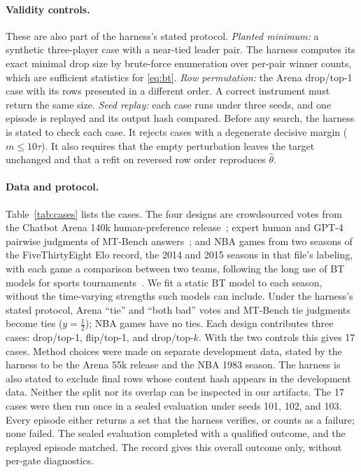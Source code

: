 \documentclass{article}
\begin{document}
\paragraph{Validity controls.}
These are also part of the harness's stated protocol. \emph{Planted minimum:} a synthetic three-player case with a near-tied leader pair. The harness computes its exact minimal drop size by brute-force enumeration over per-pair winner counts, which are sufficient statistics for \eqref{eq:bt}. \emph{Row permutation:} the Arena drop/top-1 case with its rows presented in a different order. A correct instrument must return the same size. \emph{Seed replay:} each case runs under three seeds, and one episode is replayed and its output hash compared. Before any search, the harness is stated to check each case. It rejects cases with a degenerate decisive margin ($m\le 10\tau$). It also requires that the empty perturbation leaves the target unchanged and that a refit on reversed row order reproduces $\hat\theta$.

\paragraph{Data and protocol.}
Table~\ref{tab:cases} lists the cases. The four designs are crowdsourced votes from the Chatbot Arena 140k human-preference release~\citep{Chiang2024ChatbotAA}; expert human and GPT-4 pairwise judgments of MT-Bench answers~\citep{Zheng2023JudgingLW}; and NBA games from two seasons of the FiveThirtyEight Elo record, the 2014 and 2015 seasons in that file's labeling, with each game a comparison between two teams, following the long use of BT models for sports tournaments~\citep{Cattelan2013DynamicBM}. We fit a static BT model to each season, without the time-varying strengths such models can include. Under the harness's stated protocol, Arena ``tie'' and ``both bad'' votes and MT-Bench tie judgments become ties ($y=\tfrac12$); NBA games have no ties. Each design contributes three cases: drop/top-1, flip/top-1, and drop/top-$k$. With the two controls this gives 17 cases. Method choices were made on separate development data, stated by the harness to be the Arena 55k release and the NBA 1983 season. The harness is also stated to exclude final rows whose content hash appears in the development data. Neither the split nor its overlap can be inspected in our artifacts. The 17 cases were then run once in a sealed evaluation under seeds 101, 102, and 103. Every episode either returns a set that the harness verifies, or counts as a failure; none failed. The sealed evaluation completed with a qualified outcome, and the replayed episode matched. The record gives this overall outcome only, without per-gate diagnostics.
\end{document}
